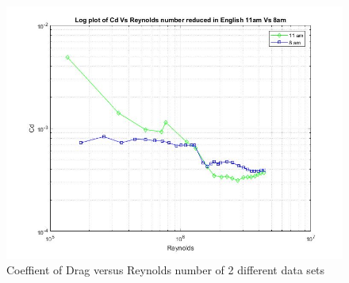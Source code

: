 \documentclass[11pt]{article}
\begin{document}
\begin{enumerate}
\begin{figure}[h]
\centering
  \includegraphics[width =7in]{combined.jpg}
  \caption{Coeffient of Drag versus Reynolds number of 2 different data sets}
  \label{fig:Cdx2}
\end{figure}

\end{enumerate}
\end{document}
